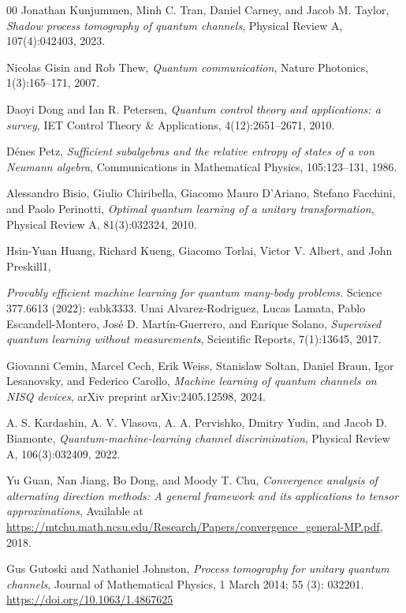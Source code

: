 \documentclass[sn-mathphys-num]{sn-jnl}%
\theoremstyle{thmstyleone}%
\theoremstyle{thmstyletwo}%
\theoremstyle{thmstylethree}%
\begin{document}
\begin{thebibliography}{00}
  Jonathan Kunjummen, Minh C. Tran, Daniel Carney, and Jacob M. Taylor,
  \textit{Shadow process tomography of quantum channels},
  Physical Review A, 107(4):042403, 2023.

  Nicolas Gisin and Rob Thew,
  \textit{Quantum communication},
  Nature Photonics, 1(3):165--171, 2007.

  Daoyi Dong and Ian R. Petersen,
  \textit{Quantum control theory and applications: a survey},
  IET Control Theory \& Applications, 4(12):2651--2671, 2010.

  Dénes Petz,
  \textit{Sufficient subalgebras and the relative entropy of states of a von Neumann algebra},
  Communications in Mathematical Physics, 105:123--131, 1986.

  Alessandro Bisio, Giulio Chiribella, Giacomo Mauro D'Ariano, Stefano Facchini, and Paolo Perinotti,
  \textit{Optimal quantum learning of a unitary transformation},
  Physical Review A, 81(3):032324, 2010.

    Hsin-Yuan Huang, Richard Kueng,  Giacomo Torlai, Victor V. Albert, and John Preskill1,

     \textit{Provably efficient machine learning for quantum many-body problems.} Science 377.6613 (2022): eabk3333.
  Unai Alvarez-Rodriguez, Lucas Lamata, Pablo Escandell-Montero, José D. Martín-Guerrero, and Enrique Solano,
  \textit{Supervised quantum learning without measurements},
  Scientific Reports, 7(1):13645, 2017.

  Giovanni Cemin, Marcel Cech, Erik Weiss, Stanislaw Soltan, Daniel Braun, Igor Lesanovsky, and Federico Carollo,
  \textit{Machine learning of quantum channels on NISQ devices},
  arXiv preprint arXiv:2405.12598, 2024.

  A. S. Kardashin, A. V. Vlasova, A. A. Pervishko, Dmitry Yudin, and Jacob D. Biamonte,
  \textit{Quantum-machine-learning channel discrimination},
  Physical Review A, 106(3):032409, 2022.

  Yu Guan, Nan Jiang, Bo Dong, and Moody T. Chu,
  \textit{Convergence analysis of alternating direction methods: A general framework and its applications to tensor approximations},
  Available at \url{https://mtchu.math.ncsu.edu/Research/Papers/convergence_general-MP.pdf}, 2018.

  Gus Gutoski and Nathaniel Johnston,
    \textit{Process tomography for unitary quantum channels},
    Journal of Mathematical Physics, 1 March 2014; 55 (3): 032201. 
    \url{https://doi.org/10.1063/1.4867625}
\end{thebibliography}

% 
% 
\end{document}
